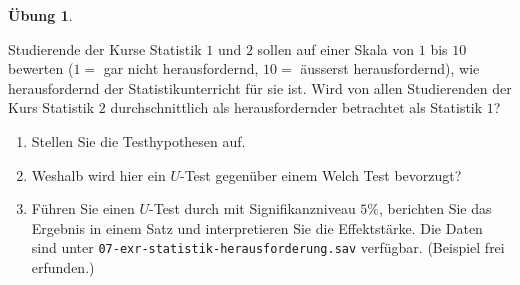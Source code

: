 \documentclass[
]{book}
\providecommand{\tightlist}{%
  \setlength{\itemsep}{0pt}\setlength{\parskip}{0pt}}
\theoremstyle{definition}
\theoremstyle{definition}
\theoremstyle{definition}
\newtheorem{exercise}{Übung}[chapter]
\theoremstyle{definition}
\theoremstyle{remark}
\begin{document}
\begin{exercise}
\protect\hypertarget{exr:statistik-herausforderung}{}\label{exr:statistik-herausforderung}\leavevmode

Studierende der Kurse Statistik \(1\) und \(2\) sollen auf einer Skala von
\(1\) bis \(10\) bewerten (\(1=\) gar nicht herausfordernd, \(10 =\) äusserst
herausfordernd), wie herausfordernd der Statistikunterricht für sie ist.
Wird von allen Studierenden der Kurs Statistik \(2\) durchschnittlich als
herausfordernder betrachtet als Statistik \(1\)?

\begin{enumerate}
\def\labelenumi{\alph{enumi})}
\tightlist
\item
  Stellen Sie die Testhypothesen auf.
\item
  Weshalb wird hier ein \(U\)-Test gegenüber einem Welch Test bevorzugt?
\item
  Führen Sie einen \(U\)-Test durch mit Signifikanzniveau \(5\%\),
  berichten Sie das Ergebnis in einem Satz und interpretieren Sie die
  Effektstärke. Die Daten sind unter
  \texttt{07-exr-statistik-herausforderung.sav} verfügbar.
  (Beispiel frei erfunden.)
\end{enumerate}

\end{exercise}
\end{document}
